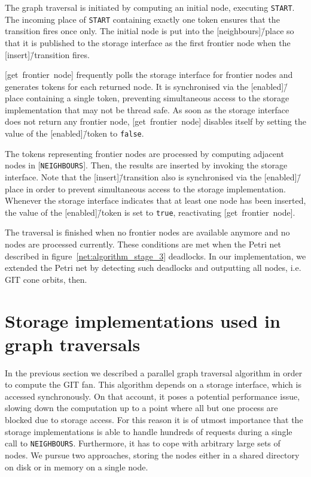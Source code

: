 The graph traversal is initiated by computing an initial node, executing \texttt{START}. The incoming place of \texttt{START} containing exactly one token ensures that the transition fires once only. The initial node is put into the [neighbours]\=/place so that it is published to the storage interface as the first frontier node when the [insert]\=/transition fires.

[get~frontier~node] frequently polls the storage interface for frontier nodes and generates tokens for each returned node. It is synchronised via the [enabled]\=/place containing a single token, preventing simultaneous access to the storage implementation that may not be thread safe. As soon as the storage interface does not return any frontier node, [get~frontier~node] disables itself by setting the value of the [enabled]\=/token to \texttt{false}.

The tokens representing frontier nodes are processed by computing adjacent nodes in [\texttt{NEIGHBOURS}]. Then, the results are inserted by invoking the storage interface. Note that the [insert]\=/transition also is synchronised via the [enabled]\=/place in order to prevent simultaneous access to the storage implementation. Whenever the storage interface indicates that at least one node has been inserted, the value of the [enabled]\=/token is set to \texttt{true}, reactivating [get~frontier~node].

The traversal is finished when no frontier nodes are available anymore and no nodes are processed currently. These conditions are met when the Petri net described in figure~\ref{net:algorithm_stage_3} deadlocks. In our implementation, we extended the Petri net by detecting such deadlocks and outputting all nodes, i.e. GIT cone orbits, then.

\section{Storage implementations used in graph traversals}
\label{sec:storage_implementations}

In the previous section we described a parallel graph traversal algorithm in order to compute the GIT fan. This algorithm depends on a storage interface, which is accessed synchronously. On that account, it poses a potential performance issue, slowing down the computation up to a point where all but one process are blocked due to storage access. For this reason it is of utmost importance that the storage implementations is able to handle hundreds of requests during a single call to \texttt{NEIGHBOURS}. Furthermore, it has to cope with arbitrary large sets of nodes. We pursue two approaches, storing the nodes either in a shared directory on disk or in memory on a single node.

